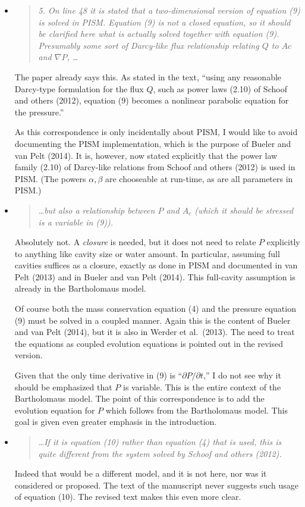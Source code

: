 \documentclass[11pt,reqno]{amsart}
\newcommand{\reply}[2]{
\medskip\medskip
\item  \begin{quote}
\emph{#1}
\end{quote}

\medskip
\noindent #2}
\begin{document}
\begin{itemize}
\reply{5. On line 48 it is stated that a two-dimensional version of equation (9) is solved in PISM.  Equation (9) is not a closed equation, so it should be clarified here what is actually solved  together with equation (9).  Presumably some sort of Darcy-like flux relationship relating $Q$ to $A c$ and $\nabla P$, \dots}
{The paper already says this.  As stated in the text, ``using any reasonable Darcy-type formulation for the flux $Q$, such as power laws (2.10) of Schoof and others (2012), equation (9) becomes a nonlinear parabolic equation for the pressure.''

As this correspondence is only incidentally about PISM, I would like to avoid documenting the PISM implementation, which is the purpose of Bueler and van Pelt (2014).  It is, however, now stated explicitly that the power law family (2.10) of Darcy-like relations from Schoof and others (2012) is used in PISM.  (The powers $\alpha,\beta$ are chooseable at run-time, as are all parameters in PISM.)}

\reply{\dots but also a relationship between $P$ and $A_c$ (which it should be stressed is a variable in (9)).}
{Absolutely not.  A \emph{closure} is needed, but it does not need to relate $P$ explicitly to anything like cavity size or water amount.  In particular, assuming full cavities suffices as a closure, exactly as done in PISM and documented in van Pelt (2013) and in Bueler and van Pelt (2014).  This full-cavity assumption is already in the Bartholomaus model.

Of course both the mass conservation equation (4) and the pressure equation (9) must be solved in a coupled manner.  Again this is the content of Bueler and van Pelt (2014), but it is also in Werder et al.~(2013).  The need to treat the equations as coupled evolution equations is pointed out in the revised version.

Given that the only time derivative in (9) is ``$\partial P/\partial t$,'' I do not see why it should be emphasized that $P$ is variable.  This is the entire context of the Bartholomaus model.  The point of this correspondence is to add the evolution equation for $P$ which follows from the Bartholomaus model.  This goal is given even greater emphasis in the introduction.}

\reply{\dots  If it is equation (10) rather than equation (4) that is used, this is quite different from the system solved by Schoof and others (2012).}
{Indeed that would be a different model, and it is not here, nor was it considered or proposed.  The text of the manuscript never suggests such usage of equation (10).  The revised text makes this even more clear.

}
\end{itemize}
\end{document}
